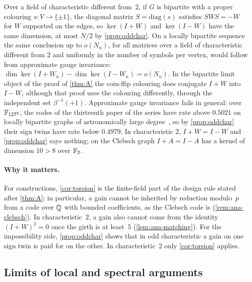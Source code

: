 \begin{remark}\label{rem:ana-gauge}
Over a field of characteristic different from~$2$, if $G$ is bipartite with a proper colouring $s\colon V\to\{\pm1\}$, the diagonal matrix $S=\mathrm{diag}(s)$ satisfies
$SWS=-W$ for $W$ supported on the edges, so $\ker(I+W)$ and $\ker(I-W)$ have the same dimension, at most $N/2$ by
\cref{prop:oddchar}. On a locally bipartite sequence the same conclusion up to $o(N_n)$, for all matrices over a field
of characteristic different from $2$ and uniformly in the number of symbols per vertex, would follow from approximate
gauge invariance: $\dim\ker(I+W_n)-\dim\ker(I-W_n)=o(N_n)$. In the bipartite limit object of the proof of \cref{thm:A}
the coin-flip colouring does conjugate $I+W$ into $I-W$, although that proof uses the colouring differently, through the
independent set $\beta^{-1}(+1)$. Approximate gauge invariance fails in general: over $\mathbb{F}_{127^2}$, the codes of the
thirteenth paper of the series have rate above $0.5021$ on locally bipartite graphs of astronomically large
degree~\cite[Corollary~U]{StorageCodes2026}, so by \cref{prop:oddchar} their sign twins have rate below $0.4979$. In characteristic $2$,
$I+W=I-W$ and \cref{prop:oddchar} says nothing; on the Clebsch graph $I+A=I-A$ has a kernel of dimension $10>8$ over
$\mathbb{F}_2$.
\end{remark}

\paragraph{Why it matters.} For constructions, \cref{cor:torsion} is the finite-field part of the design rule stated
after \cref{thm:A}; in particular, a gain cannot be inherited by reduction modulo~$p$ from a code over $\mathbb{Q}$ with bounded
coefficients, as the Clebsch code is (\cref{rem:ana-clebsch}). In characteristic~$2$, a gain also cannot come from the identity
$(I+W)^2=0$ once the girth is at least~$5$ (\cref{lem:ana-matching}). For the impossibility side,
\cref{prop:oddchar} shows that in odd characteristic a gain on one sign twin is paid for on the other. In
characteristic~$2$ only \cref{cor:torsion} applies.

\subsection{Limits of local and spectral arguments}\label{sec:ana-limits}


